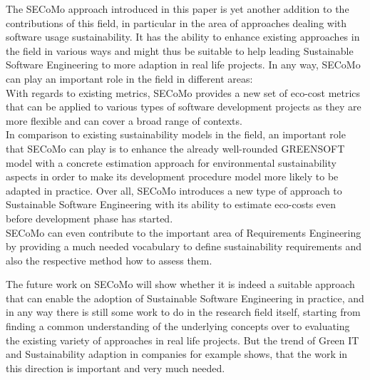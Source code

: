 The SECoMo approach introduced in this paper is yet another addition to the contributions of this field, in particular in the area of approaches dealing with software usage sustainability. %
It has the ability to enhance existing approaches in the field in various ways and might thus be suitable to help leading Sustainable Software Engineering to more adaption in real life projects. In any way, SECoMo can play an important role in the field in different areas:\\
With regards to existing metrics, SECoMo provides a new set of eco-cost metrics that can be applied to various types of software development projects as they are more flexible and can cover a broad range of contexts.\\
In comparison to existing sustainability models in the field, an important role that SECoMo can play is to enhance the already well-rounded GREENSOFT model with a concrete estimation approach for environmental sustainability aspects in order to make its development procedure model more likely to be adapted in practice. Over all, SECoMo introduces a new type of approach to Sustainable Software Engineering with its ability to estimate eco-costs even before development phase has started.\\
SECoMo can even contribute to the important area of Requirements Engineering by providing a much needed vocabulary to define sustainability requirements and also the respective method how to assess them. %

The future work on SECoMo will show whether it is indeed a suitable approach that can enable the adoption of Sustainable Software Engineering in practice, and in any way there is still some work to do in the research field itself, starting from finding a common understanding of the underlying concepts over to evaluating the existing variety of approaches in real life projects. But the trend of Green IT and Sustainability adaption in companies for example shows, that the work in this direction is important and very much needed.
